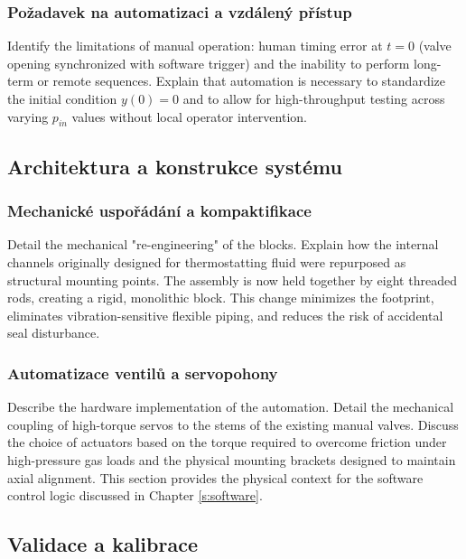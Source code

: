 \subsubsection{Požadavek na automatizaci a vzdálený přístup}\label{sss:pozadavek_na_automatizaci}
Identify the limitations of manual operation: human timing error at $t=0$ (valve opening synchronized with software trigger) and the inability to perform long-term or remote sequences. Explain that automation is necessary to standardize the initial condition $y(0)=0$ and to allow for high-throughput testing across varying $p_{in}$ values without local operator intervention.

\subsection{Architektura a konstrukce systému}\label{ss:architektura_systemu}

\subsubsection{Mechanické uspořádání a kompaktifikace}\label{sss:kompaktifikace}
Detail the mechanical "re-engineering" of the blocks. Explain how the internal channels originally designed for thermostatting fluid were repurposed as structural mounting points. The assembly is now held together by eight threaded rods, creating a rigid, monolithic block. This change minimizes the footprint, eliminates vibration-sensitive flexible piping, and reduces the risk of accidental seal disturbance.

\subsubsection{Automatizace ventilů a servopohony}\label{sss:automatizace_ventilu}
Describe the hardware implementation of the automation. Detail the mechanical coupling of high-torque servos to the stems of the existing manual valves. Discuss the choice of actuators based on the torque required to overcome friction under high-pressure gas loads and the physical mounting brackets designed to maintain axial alignment. This section provides the physical context for the software control logic discussed in Chapter \ref{s:software}.

\subsection{Validace a kalibrace}\label{ss:validace_a_kalibrace}

